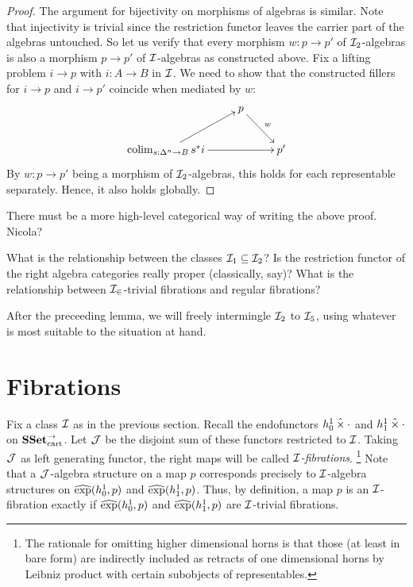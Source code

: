 \documentclass[reqno,10pt,a4paper,oneside]{amsart}
\begin{document}
\begin{proof}
The argument for bijectivity on morphisms of algebras is similar.
Note that injectivity is trivial since the restriction functor leaves the carrier part of the algebras untouched.
So let us verify that every morphism $w : p \to p'$ of $\cal{I}_2$-algebras is also a morphism $p \to p'$ of $\cal{I}$-algebras as constructed above.
Fix a lifting problem $i \to p$ with $i : A \to B$ in $\cal{I}$.
We need to show that the constructed fillers for $i \to p$ and $i \to p'$ coincide when mediated by $w$:
\[
\xymatrix{
&
  p
  \ar[dr]^{w}
\\
  \colim_{s : \Delta^n \to B} s^* i
  \ar[ur]
  \ar[rr]
&&
  p'
}
\]
By $w : p \to p'$ being a morphism of $\cal{I}_2$-algebras, this holds for each representable separately.
Hence, it also holds globally.
\end{proof}

\begin{question}
There must be a more high-level categorical way of writing the above proof.
Nicola?
\end{question}

\begin{question}
What is the relationship between the classes $\cal{I}_1 \subseteq \cal{I}_2$? 
Is the restriction functor of the right algebra categories really proper (classically, say)?
What is the relationship between $\cal{I_2}$-trivial fibrations and regular fibrations?
\end{question}

After the preceeding lemma, we will freely intermingle $\cal{I}_2$ to $\cal{I}_5$, using whatever is most suitable to the situation at hand.

\section*{Fibrations}

Fix a class $\cal{I}$ as in the previous section.
Recall the endofunctors $h_0^1 \hattimes \arghole$ and $h_1^1 \hattimes \arghole$ on $\SSetCart$.
Let $\cal{J}$ be the disjoint sum of these functors restricted to $\cal{I}$.
Taking $\cal{J}$ as left generating functor, the right maps will be called \emph{$\cal{I}$-fibrations}.
\footnote{The rationale for omitting higher dimensional horns is that those (at least in bare form) are indirectly included as retracts of one dimensional horns by Leibniz product with certain subobjects of representables.}
Note that a $\cal{J}$-algebra structure on a map $p$ corresponds precisely to $\cal{I}$-algebra structures on $\hatexp(h_0^1, p)$ and $\hatexp(h_1^1, p)$.
Thus, by definition, a map $p$ is an $\cal{I}$-fibration exactly if $\hatexp(h_0^1, p)$ and $\hatexp(h_1^1, p)$ are $\cal{I}$-trivial fibrations.
\end{document}
